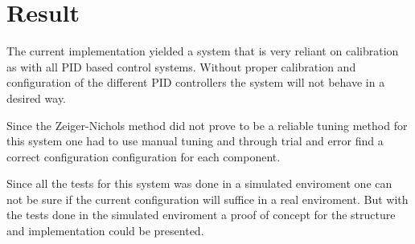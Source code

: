 \section{Result}\label{sec:result}

The current implementation yielded a system that is very reliant on calibration as with all PID based control systems. Without proper calibration and configuration of the different PID controllers the system will not behave in a desired way. 

Since the Zeiger-Nichols method did not prove to be a reliable tuning method for this system one had to use manual tuning and through trial and error find a correct configuration configuration for each component.

Since all the tests for this system was done in a simulated enviroment one can not be sure if the current configuration will suffice in a real enviroment. But with the tests done in the simulated enviroment a proof of concept for the structure and implementation could be presented.
